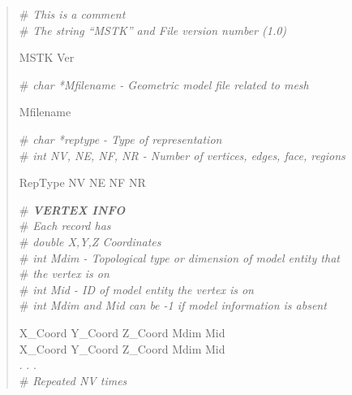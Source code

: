 \documentclass[12pt]{article}
\begin{document}
\begin{verse}
\# \textit{This is a comment} \\
\# \textit{The string ``MSTK'' and File version number (1.0)} \\
\vspace{1ex}
 
MSTK Ver %
\vspace{1ex}

\# \textit{char *Mfilename - Geometric model file related to mesh} 
\vspace{1ex}

Mfilename
\vspace{1ex}

\# \textit{char *reptype - Type of representation} \\  
\# \textit{int NV, NE, NF, NR - Number of vertices, edges, face, regions} \\
\vspace{1ex}

RepType \hspace{0.5ex} NV \hspace{0.5ex} NE \hspace{0.5ex} NF \hspace{0.5ex} NR \\
\hspace{2ex}

\# \textit{\textbf{VERTEX INFO}} \\
\# \textit{Each record has} \\
\# \textit{double X,Y,Z Coordinates} \\
\# \textit{int Mdim - Topological type or dimension of model entity that} \\
\# \textit{\hspace{4.7em} the vertex is on} \\
\# \textit{int Mid - ID of model entity the vertex is on} \\
\# \textit{int Mdim and Mid can be -1 if model information is absent} 
\vspace{1ex}

X\_Coord \hspace{0.5ex} Y\_Coord \hspace{0.5ex} Z\_Coord \hspace{0.5ex} Mdim \hspace{0.5ex} Mid \\
X\_Coord \hspace{0.5ex} Y\_Coord \hspace{0.5ex} Z\_Coord \hspace{0.5ex} Mdim \hspace{0.5ex} Mid \\
. . . \\
\# \textit{Repeated NV times}
\vspace{2ex}


\end{verse}
\end{document}
